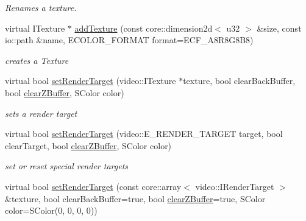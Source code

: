 \begin{DoxyCompactItemize}
\begin{DoxyCompactList}\small\item\em Renames a texture. \end{DoxyCompactList}\item 
\hypertarget{classirr_1_1video_1_1_c_null_driver_aab44a5601ba8bcfce1a1ccc86a65cd63}{virtual I\-Texture $\ast$ \hyperlink{classirr_1_1video_1_1_c_null_driver_aab44a5601ba8bcfce1a1ccc86a65cd63}{add\-Texture} (const core\-::dimension2d$<$ u32 $>$ \&size, const io\-::path \&name, E\-C\-O\-L\-O\-R\-\_\-\-F\-O\-R\-M\-A\-T format=E\-C\-F\-\_\-\-A8\-R8\-G8\-B8)}\label{classirr_1_1video_1_1_c_null_driver_aab44a5601ba8bcfce1a1ccc86a65cd63}

\begin{DoxyCompactList}\small\item\em creates a Texture \end{DoxyCompactList}\item 
\hypertarget{classirr_1_1video_1_1_c_null_driver_a31990a1f268415be4eb4c0e835d48980}{virtual bool \hyperlink{classirr_1_1video_1_1_c_null_driver_a31990a1f268415be4eb4c0e835d48980}{set\-Render\-Target} (video\-::\-I\-Texture $\ast$texture, bool clear\-Back\-Buffer, bool \hyperlink{classirr_1_1video_1_1_c_null_driver_a6cc425f2db0630ca8a60e1b42c3a13aa}{clear\-Z\-Buffer}, S\-Color color)}\label{classirr_1_1video_1_1_c_null_driver_a31990a1f268415be4eb4c0e835d48980}

\begin{DoxyCompactList}\small\item\em sets a render target \end{DoxyCompactList}\item 
\hypertarget{classirr_1_1video_1_1_c_null_driver_a1824a89e871bb1e7a9a9ed18beb193aa}{virtual bool \hyperlink{classirr_1_1video_1_1_c_null_driver_a1824a89e871bb1e7a9a9ed18beb193aa}{set\-Render\-Target} (video\-::\-E\-\_\-\-R\-E\-N\-D\-E\-R\-\_\-\-T\-A\-R\-G\-E\-T target, bool clear\-Target, bool \hyperlink{classirr_1_1video_1_1_c_null_driver_a6cc425f2db0630ca8a60e1b42c3a13aa}{clear\-Z\-Buffer}, S\-Color color)}\label{classirr_1_1video_1_1_c_null_driver_a1824a89e871bb1e7a9a9ed18beb193aa}

\begin{DoxyCompactList}\small\item\em set or reset special render targets \end{DoxyCompactList}\item 
\hypertarget{classirr_1_1video_1_1_c_null_driver_a63c0362199ccec08a4fadace5c9b6afb}{virtual bool \hyperlink{classirr_1_1video_1_1_c_null_driver_a63c0362199ccec08a4fadace5c9b6afb}{set\-Render\-Target} (const core\-::array$<$ video\-::\-I\-Render\-Target $>$ \&texture, bool clear\-Back\-Buffer=true, bool \hyperlink{classirr_1_1video_1_1_c_null_driver_a6cc425f2db0630ca8a60e1b42c3a13aa}{clear\-Z\-Buffer}=true, S\-Color color=S\-Color(0, 0, 0, 0))}\label{classirr_1_1video_1_1_c_null_driver_a63c0362199ccec08a4fadace5c9b6afb}


\end{DoxyCompactItemize}
